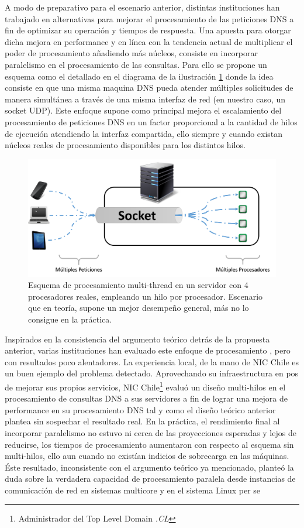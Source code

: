 A modo de preparativo para el escenario anterior, distintas instituciones han trabajado en alternativas para mejorar el procesamiento de las peticiones DNS a fin de optimizar su operación y tiempos de respuesta. Una apuesta para otorgar dicha mejora en performance y en línea con la tendencia actual de multiplicar el poder de procesamiento añadiendo más núcleos, consiste en incorporar paralelismo en el procesamiento de las consultas. Para ello se propone un esquema como el detallado en el diagrama de la ilustración \ref{fig:multi_thread} donde la idea consiste en que una misma maquina DNS pueda atender múltiples solicitudes de manera simultánea a través de una misma interfaz de red (en nuestro caso, un socket UDP). Este enfoque supone como principal mejora el escalamiento del procesamiento de peticiones DNS en un factor proporcional a la cantidad de hilos de ejecución atendiendo la interfaz compartida, ello siempre y cuando existan núcleos reales de procesamiento disponibles para los distintos hilos. 

\begin{figure}[!h]
	\centering
	\includegraphics[scale=0.45]{imagenes/conf_multi_thread}
	\caption{Esquema de procesamiento multi-thread en un servidor con 4 procesadores reales, empleando un hilo por procesador. Escenario que en teoría, supone un mejor desempeño general, más no lo consigue en la práctica.}
	\label{fig:multi_thread}
\end{figure}

Inspirados en la consistencia del argumento teórico detrás de la propuesta anterior, varias instituciones han evaluado este enfoque de procesamiento \cite{post:facebook, paper:toshiba}, pero con resultados poco alentadores. La experiencia local, de la mano de NIC Chile es un buen ejemplo del problema detectado. Aprovechando su infraestructura en pos de mejorar sus propios servicios, NIC Chile\footnote{Administrador del Top Level Domain \emph{.CL}} evaluó un diseño multi-hilos en el procesamiento de consultas DNS a sus servidores a fin de lograr una mejora de performance en su procesamiento DNS tal y como el diseño teórico anterior plantea sin sospechar el resultado real. En la práctica, el rendimiento final al incorporar paralelismo no estuvo ni cerca de las proyecciones esperadas y lejos de reducirse, los tiempos de procesamiento aumentaron con respecto al esquema sin multi-hilos, ello aun cuando no existían indicios de sobrecarga en las máquinas. Éste resultado, inconsistente con el argumento teórico ya mencionado, planteó la duda sobre la verdadera capacidad de procesamiento paralela desde instancias de comunicación de red en sistemas multicore y en el sistema Linux per se


